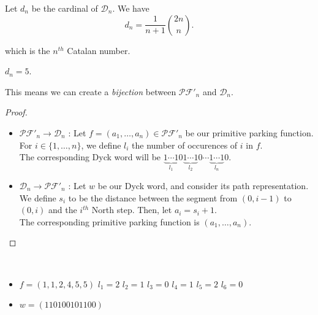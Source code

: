 \begin{theorem}[André, 1887]
    Let $d_n$ be the cardinal of $\mathcal{D}_n$.
    We have $$d_n = \frac{1}{n + 1} \binom {2n}{n}.$$
\end{theorem}

which is the $n^{th}$ Catalan number.

\begin{example}[$n = 3$]
    $d_n = 5$.
    \begin{center}
        
        
        
        
        
    \end{center}
\end{example}

\begin{prop}
    This means we can create a \emph{bijection} between
    $\mathcal{PF'}_n$ and $\mathcal{D}_n$.
\end{prop}

\begin{proof}
    ~\
\begin{itemize}
    \item $\mathcal{PF'}_n \to \mathcal{D}_n$ :
    Let $f = (a_1, \ldots, a_n) \in \mathcal{PF'}_n$
    be our primitive parking function.
    For $i \in \{1, \ldots, n\}$, we define $l_i$ the
    number of occurences of $i$ in $f$.\\
    The corresponding Dyck word will be
    $\underbrace{1 \cdots 1}_{l_1}0
     \underbrace{1 \cdots 1}_{l_2}0 \cdots
     \underbrace{1 \cdots 1}_{l_n}0$.
    
    \item $\mathcal{D}_n \to \mathcal{PF'}_n$ :
    Let $w$ be our Dyck word, and consider its path
    representation. We define $s_i$ to be the distance
    between the segment from $(0, i - 1)$ to $(0, i)$
    and the $i^{th}$ North step. Then, let $a_i = s_i + 1$.\\
    The corresponding primitive parking function is 
    $(a_1, \ldots, a_n)$.
\end{itemize}
\end{proof}

\begin{example}[$n = 6, \mathcal{PF'}_n \to \mathcal{D}_n$]
    ~\
    \begin{itemize}
        \item $f = (1, 1, 2, 4, 5, 5)$
            \subitem $l_1 = 2$
            \hspace{2cm} $l_2 = 1$
            \hspace{2cm} $l_3 = 0$
            \subitem $l_4 = 1$
            \hspace{2cm} $l_5 = 2$
            \hspace{2cm} $l_6 = 0$
        \item $w = (110100101100)$
    \end{itemize}
    
\end{example}

